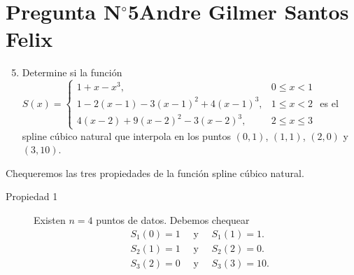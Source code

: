 \section{Pregunta N$^{\circ}$5\qquad Andre Gilmer Santos Felix}

\begin{frame}
    \begin{enumerate}\setcounter{enumi}{4}
        \item

              Determine si la función
              \begin{math}
                  S\left(x\right)=
                  \begin{cases}
                      1+
                      x-
                      x^{3},                   & 0 \leq x<1      \\
                      1-
                      2\left(x-1\right)-
                      3{\left(x-1\right)}^{2}+
                      4{\left(x-1\right)}^{3}, & 1 \leq x<2      \\
                      4\left(x-2\right)+
                      9{\left(x-2\right)}^{2}-
                      3{\left(x-2\right)}^{3}, & 2 \leq x \leq 3
                  \end{cases}
              \end{math}
              es el \alert{spline cúbico natural} que interpola en
              los puntos $\left(0,1\right)$, $\left(1,1\right)$,
              $\left(2,0\right)$ y $\left(3,10\right)$.
    \end{enumerate}

    \begin{solution}
        Chequeremos las tres propiedades de la función spline cúbico natural.

        \begin{description}
            \item[Propiedad 1]

                Existen $n=4$ puntos de datos.
                Debemos chequear
                \begin{align*}
                     & S_{1}\left(0\right)=1\quad\text { y }\quad S_{1}\left(1\right)=1.  \\
                     & S_{2}\left(1\right)=1\quad\text { y }\quad S_{2}\left(2\right)=0.  \\
                     & S_{3}\left(2\right)=0\quad\text { y }\quad S_{3}\left(3\right)=10.
                \end{align*}


\end{description}
\end{solution}
\end{frame}
